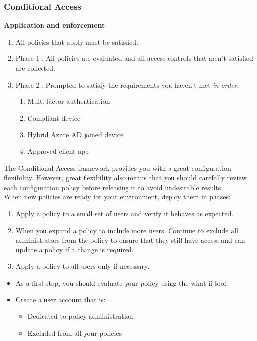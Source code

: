\subsubsection{Conditional Access}
\textbf{Application and enforcement}
\begin{enumerate}
\item All policies that apply must be satisfied.
\item Phase 1 : All policies are evaluated and all access controls that aren't satisfied are collected.
\item Phase 2 : Prompted to satisfy the requirements you haven't met \textit{in order}.
	\begin{enumerate}
	\item Multi-factor authentication
	\item Compliant device
	\item Hybrid Azure AD joined device
	\item Approved client app
	\end{enumerate}
\end{enumerate}
The Conditional Access framework provides you with a great configuration flexibility. However, great flexibility also means that you should carefully review each configuration policy before releasing it to avoid undesirable results.  \\

When new policies are ready for your environment, deploy them in phases:
\begin{enumerate}
\item Apply a policy to a small set of users and verify it behaves as expected.
\item When you expand a policy to include more users. Continue to exclude all administrators from the policy to ensure that they still have access and can update a policy if a change is required.
\item Apply a policy to all users only if necessary.
\end{enumerate}

\begin{itemize}
\item As a first step, you should evaluate your policy using the what if tool.
\item Create a user account that is:
	\begin{itemize}
	\item Dedicated to policy administration
	\item Excluded from all your policies
	\end{itemize}
\end{itemize}

